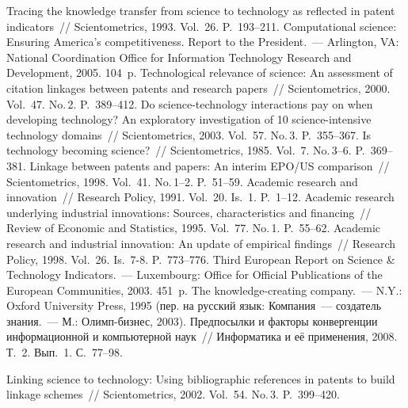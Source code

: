 \begin{multicols}{2}
{{\begin{thebibliography}{99}
 Tracing the knowledge transfer from science to technology as reflected in patent indicators~// 
Scientometrics, 1993. Vol.~26. P.~193--211.
Computational science: Ensuring America's competitiveness. Report to the President.~--- Arlington, VA: 
National Coordination Office for Information Technology Research and Development, 2005. 104~p.
 Technological relevance of science: An assessment of 
citation linkages between patents and research papers~// Scientometrics, 2000. Vol.~47. No.\,2. P.~389--412.
 Do science-technology 
interactions pay on when developing technology? An exploratory investigation of 10 science-intensive 
technology domains~// Scientometrics, 2003.  Vol.~57. No.\,3. P.~355--367.
 Is technology becoming science?~// 
Scientometrics, 1985. Vol.~7. No.\,3--6. 
P.~369--381.
 Linkage between patents and papers: An interim EPO/US comparison~// 
Scientometrics, 1998. Vol.~41. No.\,1--2. P.~51--59.
 Academic research and innovation~// Research Policy, 1991. Vol.~20. Is.~1. P.~1--12.
 Academic research underlying industrial innovations: Sources, characteristics and 
financing~// Review of Economic and Statistics, 1995.  Vol.~77. No.\,1. P.~55--62.
 Academic research and industrial innovation: An update of empirical findings~// Research 
Policy, 1998. Vol.~26. Is.~7-8. P.~773--776.
Third European Report on Science \& Technology Indicators.~--- Luxembourg: Office for Official Publications 
of the European Communities, 2003. 451~p.
 The knowledge-creating company.~--- N.Y.: Oxford University Press, 1995 (пер. 
на русский язык:  Компания~--- создатель знания.~--- М.: Олимп-биз\-нес, 
2003).
 Предпосылки и факторы конвергенции информационной и 
компьютерной наук~// Информатика и её применения, 2008. Т.~2. Вып.~1. С.~77--98.

\label{end\stat}

 Linking science to 
technology: Using bibliographic references in patents to build linkage schemes~// Scientometrics, 2002. 
Vol.~54. No.\,3. P.~399--420.
\end{thebibliography}
}
}

\end{multicols}
